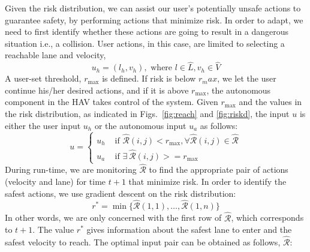 \documentclass[letterpaper, 10 pt, conference]{ieeeconf}  %
\newcommand\NB[1]{$\spadesuit$\footnote{NB: #1}}
\begin{document}
Given the risk distribution, we can assist our user's potentially unsafe actions to guarantee safety, by performing actions that minimize risk. In order to adapt, we need to first identify whether these actions are going to result in a dangerous situation i.e., a collision. User actions, in this case, are limited to selecting a reachable lane and velocity,
\begin{equation}
u_h = (l_h,v_h), \text{ where } l\in\hat{L}, v_h\in\hat{V}
\end{equation}
A user-set threshold, $r_\max$ is defined. If risk is below $r_max$, we let the user continue his/her desired actions, and if it is above $r_\max$, the autonomous component in the HAV takes control of the system. Given $r_\max$ and the values in the risk distribution, as indicated in Figs.~\ref{fig:reach} and \ref{fig:riskd}, the input $u$ is either the user input $u_h$ or the autonomous input $u_a$ as follows:
\begin{equation} \label{eq:inputctrl}
    u = \begin{cases}
    u_h & \text{ if } \hat{\mathcal{R}}(i,j) < r_\max, \forall\hat{\mathcal{R}}(i,j)\in\hat{\mathcal{R}} \\
    u_a & \text{ if } \exists~\hat{\mathcal{R}}(i,j) >= r_\max
    \end{cases}
\end{equation}
During run-time, we are monitoring $\hat{\mathcal{R}}$ to find the appropriate pair of actions (velocity and lane) for time $t+1$ that minimize risk. In order to identify the safest actions, we use gradient descent on the risk distribution:
\begin{equation} \label{eq:optpt}
  r^* = \min\{\hat{\mathcal{R}}(1,1),\ldots,\hat{\mathcal{R}}(1,n)\}  
\end{equation}
In other words, we are only concerned with the first row of $\hat{\mathcal{R}}$, which corresponds to $t+1$.
The value $r^*$ gives information about the safest lane to enter and the safest velocity to reach. The optimal input pair can be obtained as follows, $\hat{\mathcal{R}}$:
\end{document}

